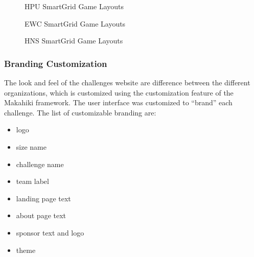\begin{figure}[htbp]
	\centering
		\caption{HPU SmartGrid Game Layouts}
		\label{fig:HPU-SGG}
\end{figure}

\begin{figure}[htbp]
	\centering
		\caption{EWC SmartGrid Game Layouts}
		\label{fig:EWC-SGG}
\end{figure}

\begin{figure}[htbp]
	\centering
		\caption{HNS SmartGrid Game Layouts}
		\label{fig:GS-SGG}
\end{figure}

\subsubsection{Branding Customization}
The look and feel of the challenges website are difference between the different organizations, which is customized using the customization feature of the Makahiki framework. The user interface was customized to ``brand'' each challenge. The list of customizable branding are:

\begin{itemize}
\item logo
\item size name
\item challenge name
\item team label
\item landing page text
\item about page text
\item sponsor text and logo
\item theme
\end{itemize}

